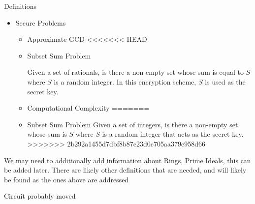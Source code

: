 \documentclass[a0,portrait]{a0poster}
\begin{document}
\begin{multicols}{2}
\begin{slide}{Definitions}
\begin{itemize}
  Re-encrypting already encrypted data using elements from the original encryption circuit.
\begin{itemize}
\item Compact
\end{itemize}
\item Secure Problems
\begin{itemize}
\item Approximate GCD
<<<<<<< HEAD
\item Subset Sum Problem 

  Given a set of rationals, is there a non-empty set whose sum is equal to $S$ where $S$ is a random integer. In this encryption scheme, $S$ is used as the secret key.
\item Computational Complexity
=======
\item Subset Sum Problem
  Given a set of integers, is there a non-empty set whose sum is $S$ where $S$ is a random integer that acts as the secret key.
>>>>>>> 2b292a1455d7dbf8b87c23d0c705aa379e958d66
\end{itemize}

\end{itemize}


We may need to additionally add information about Rings, Prime Ideals, this can be added later. There are likely other definitions that are needed, and will likely be found as the ones above are addressed
\end{slide}


\begin{slide}{Circuit probably moved}

\begin{multicols}{3}



\end{multicols}
\end{slide}
\end{multicols}
\end{document}
